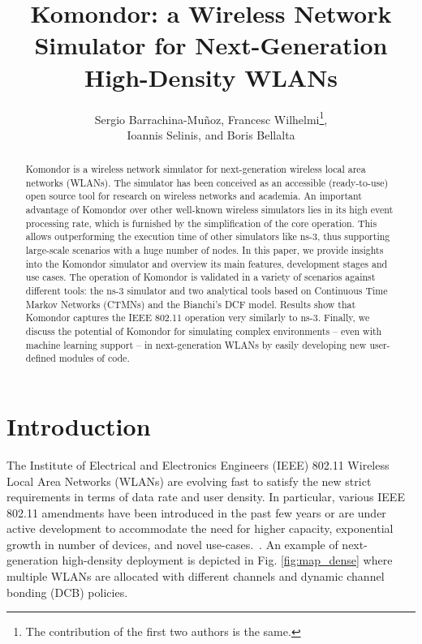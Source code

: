 \documentclass{article}
\begin{document}
	
	\title{Komondor: a Wireless Network Simulator for Next-Generation High-Density WLANs}

	\author{Sergio Barrachina-Muñoz, Francesc Wilhelmi\thanks{The contribution of the first two authors is the same.},\\ Ioannis Selinis, and Boris Bellalta}
	\date{ }
	\maketitle

	\begin{abstract}
		Komondor is a wireless network simulator for next-generation wireless local area networks (WLANs). The simulator has been conceived as an accessible (ready-to-use) open source tool for research on wireless networks and academia. An important advantage of Komondor over other well-known wireless simulators lies in its high event processing rate, which is furnished by the simplification of the core operation. This allows outperforming the execution time of other simulators like ns-3, thus supporting large-scale scenarios with a huge number of nodes. In this paper, we provide insights into the Komondor simulator and overview its main features, development stages and use cases. The operation of Komondor is validated in a variety of scenarios against different tools: the ns-3 simulator and two analytical tools based on Continuous Time Markov Networks (CTMNs) and the Bianchi's DCF model. Results show that Komondor captures the IEEE 802.11 operation very similarly to ns-3. Finally, we discuss the potential of Komondor for simulating complex environments -- even with machine learning support -- in next-generation WLANs by easily developing new user-defined modules of code.
	\end{abstract}
	
	\section{Introduction}
	\label{section:introduction}
	
	The Institute of Electrical and Electronics Engineers (IEEE) 802.11 Wireless Local Area Networks (WLANs) are evolving fast to satisfy the new strict requirements in terms of data rate and user density. In particular, various IEEE 802.11 amendments have been introduced in the past few years or are under active development to accommodate the need for higher capacity, exponential growth in number of devices, and novel use-cases.~\cite{8485317_selOA}. An example of next-generation high-density deployment is depicted in Fig. \ref{fig:map_dense} where multiple WLANs are allocated with different channels and dynamic channel bonding (DCB) policies.
	
\end{document}

